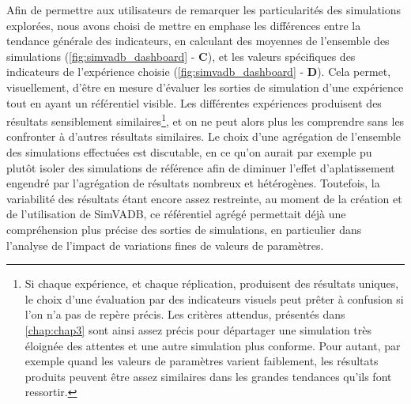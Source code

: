 Afin de permettre aux utilisateurs de remarquer les particularités des simulations explorées, nous avons choisi de mettre en emphase les différences entre la tendance générale des indicateurs, en calculant des moyennes de l'ensemble des simulations (\cref{fig:simvadb_dashboard} - \textbf{C}), et les valeurs spécifiques des indicateurs de l'expérience choisie (\cref{fig:simvadb_dashboard} - \textbf{D}).
Cela permet, visuellement, d'être en mesure d'évaluer les sorties de simulation d'une expérience tout en ayant un référentiel visible.
Les différentes expériences produisent des résultats sensiblement similaires\footnote{
	Si chaque expérience, et chaque réplication, produisent des résultats uniques, le choix d'une évaluation par des indicateurs visuels peut prêter à confusion si l'on n'a pas de repère précis.
	Les critères attendus, présentés dans \cref{chap:chap3} sont ainsi assez précis pour départager une simulation très éloignée des attentes et une autre simulation plus conforme.
	Pour autant, par exemple quand les valeurs de paramètres varient faiblement, les résultats produits peuvent être assez similaires dans les grandes tendances qu'ils font ressortir.
}, et on ne peut alors plus les comprendre sans les confronter à d'autres résultats similaires.
Le choix d'une agrégation de l'ensemble des simulations effectuées est discutable, en ce qu'on aurait par exemple pu plutôt isoler des simulations \og de référence \fg{} afin de diminuer l'effet \og d'aplatissement \fg{} engendré par l'agrégation de résultats nombreux et hétérogènes.
Toutefois, la variabilité des résultats étant encore assez restreinte, au moment de la création et de l'utilisation de SimVADB, ce référentiel agrégé permettait déjà une compréhension plus précise des sorties de simulations, en particulier dans l'analyse de l'impact de variations fines de valeurs de paramètres.

